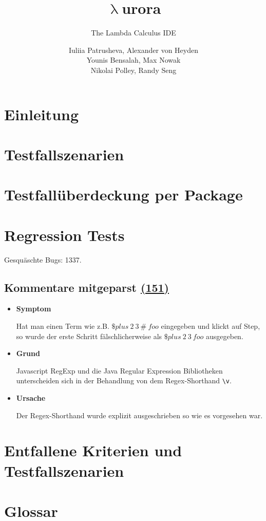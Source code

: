 \documentclass[parskip=full,11pt,twoside]{scrartcl}
\title{\textbf{$\uplambda$}urora}
\subtitle{The Lambda Calculus IDE}
\author{Iuliia Patrusheva, Alexander von Heyden\\
    Younis Bensalah, Max Nowak\\
    Nikolai Polley, Randy Seng}
\newcommand{\issueref}[1]{
    \href{https://git.scc.kit.edu/ap/Aurora/issues/#1}{(#1)}
}
\newcommand{\regrtest}[5]{
    \subsection{#1 \issueref{#2}}
    \begin{itemize}
        \item \textbf{Symptom}
            #3
        \item \textbf{Grund}
            #4
        \item \textbf{Ursache}
            #5
    \end{itemize}
}
\begin{document}
    \maketitle
    \tableofcontents
    \newpage

    \section{Einleitung}


    \section{Testfallszenarien}

    \section{Testfallüberdeckung per Package}

    \section{Regression Tests}
    Gesquäschte Bugs: 1337.

    \regrtest{Kommentare mitgeparst}{151}{
        Hat man einen Term wie z.B. $\$plus\ 2\ 3\ \#\ foo$ eingegeben und klickt auf Step, so wurde der erste Schritt
        fälschlicherweise als $\$plus\ 2\ 3\ foo$ ausgegeben.
    }{
        Javascript RegExp und die Java Regular Expression Bibliotheken unterscheiden sich in der Behandlung von dem
        Regex-Shorthand \texttt{\textbackslash v}.
    }{
        Der Regex-Shorthand wurde explizit ausgeschrieben so wie es vorgesehen war.
    }

    \section{Entfallene Kriterien und Testfallszenarien}

    \section{Glossar}
\end{document}
